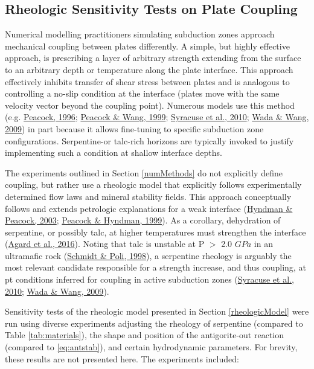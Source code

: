 \hypertarget{rheologicSensitivity}{%
\subsection{Rheologic Sensitivity Tests on Plate Coupling}\label{rheologicSensitivity}}

Numerical modelling practitioners simulating subduction zones approach mechanical coupling between plates differently. A simple, but highly effective approach, is prescribing a layer of arbitrary strength extending from the surface to an arbitrary depth or temperature along the plate interface. This approach effectively inhibits transfer of shear stress between plates and is analogous to controlling a no-slip condition at the interface (plates move with the same velocity vector beyond the coupling point). Numerous models use this method (e.g. \protect\hyperlink{ref-peacock1996}{Peacock, 1996}; \protect\hyperlink{ref-peacock1999b}{Peacock \& Wang, 1999}; \protect\hyperlink{ref-syracuse2010}{Syracuse et al., 2010}; \protect\hyperlink{ref-wada2009}{Wada \& Wang, 2009}) in part because it allows fine-tuning to specific subduction zone configurations. Serpentine-or talc-rich horizons are typically invoked to justify implementing such a condition at shallow interface depths.

The experiments outlined in Section \ref{numMethods} do not explicitly define coupling, but rather use a rheologic model that explicitly follows experimentally determined flow laws and mineral stability fields. This approach conceptually follows and extends petrologic explanations for a weak interface (\protect\hyperlink{ref-hyndman2003}{Hyndman \& Peacock, 2003}; \protect\hyperlink{ref-peacock1999a}{Peacock \& Hyndman, 1999}). As a corollary, dehydration of serpentine, or possibly talc, at higher temperatures must strengthen the interface (\protect\hyperlink{ref-agard2016}{Agard et al., 2016}). Noting that talc is unstable at P \(>\) 2.0 \(GPa\) in an ultramafic rock (\protect\hyperlink{ref-schmidt1998}{Schmidt \& Poli, 1998}), a serpentine rheology is arguably the most relevant candidate responsible for a strength increase, and thus coupling, at \gls{pt} conditions inferred for coupling in active subduction zones (\protect\hyperlink{ref-syracuse2010}{Syracuse et al., 2010}; \protect\hyperlink{ref-wada2009}{Wada \& Wang, 2009}).

Sensitivity tests of the rheologic model presented in Section \ref{rheologicModel} were run using diverse experiments adjusting the rheology of serpentine (compared to Table \ref{tab:materials}), the shape and position of the antigorite-out reaction (compared to \eqref{eq:antstab}), and certain hydrodynamic parameters. For brevity, these results are not presented here. The experiments included:

